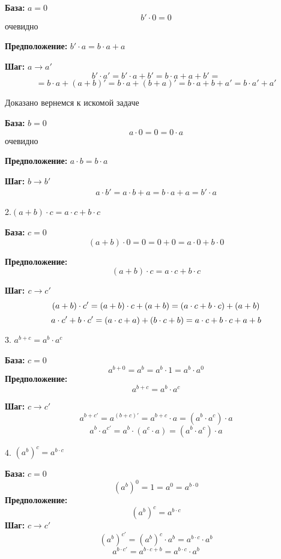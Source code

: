 \textbf{База:} \( a = 0 \)
  \[
  b' \cdot 0 = 0
  \]
  очевидно

\textbf{Предположение:} \( b'\cdot a=b \cdot a + a \)

\textbf{Шаг:} \( a \to a' \)
  \[
  b'\cdot a'=b' \cdot a + b'=b \cdot a + a + b' =  \]
  $$= b \cdot a + (a+b)' =  b \cdot a + (b + a)' = b \cdot a + b + a' = b \cdot a' + a'$$

Доказано вернемся к искомой задаче

\textbf{База:} \( b = 0 \)
  \[
  a \cdot 0 = 0 = 0 \cdot a
  \]
  очевидно

\textbf{Предположение:} \( a \cdot b = b \cdot a \)

\textbf{Шаг:} \( b \to b' \)
  \[
  \begin{aligned}
  a \cdot b' = a \cdot b + a = b \cdot a + a = b'\cdot a
  \end{aligned}
  \]




 2.\((a + b) \cdot c = a \cdot c + b \cdot c\)

\textbf{База:} \( c = 0 \)
  \[
  (a + b) \cdot 0 = 0 = 0 + 0 = a \cdot 0 + b \cdot 0
  \]

\textbf{Предположение:}
  \[
  (a + b) \cdot c = a \cdot c + b \cdot c
  \]

\textbf{Шаг: \( c \to c' \)}
  \[
  (a + b) \cdot c' = (a + b) \cdot c + (a + b) \\
  = (a \cdot c + b \cdot c) + (a + b) \]
  \[
  a \cdot c' + b \cdot c' = (a \cdot c + a) + (b \cdot c + b) \\
  = a \cdot c + b \cdot c + a + b
  \]




3. \( a^{b + c} = a^b \cdot a^c \)



\textbf{База:} \( c = 0 \)
  \[
  a^{b + 0} = a^b = a^b \cdot 1 = a^b \cdot a^0
  \]
\textbf{Предположение:} 
  \[
  a^{b + c} = a^b \cdot a^c
  \]

\textbf{Шаг:} \( c \to c' \)
  $$
  a^{b + c'} = a^{(b + c)'} = a^{b + c} \cdot a = (a^b \cdot a^c) \cdot a$$ 
  $$ 
  a^b \cdot a^{c'} = a^b \cdot (a^c \cdot a) = (a^b \cdot a^c) \cdot a$$

  

4. \( (a^b)^c = a^{b \cdot c} \)



\textbf{База:} \( c = 0 \)
  \[
  (a^b)^0 = 1 = a^0 = a^{b \cdot 0}
  \]
\textbf{Предположение:} 
  \[
  (a^b)^c = a^{b \cdot c}
  \]
\textbf{Шаг:} \( c \to c' \)
  \[
  (a^b)^{c'} = (a^b)^c \cdot a^b = a^{b \cdot c} \cdot a^b \]
  \[
  a^{b \cdot c'} = a^{b \cdot c + b} = a^{b \cdot c} \cdot a^b
  \]
  
